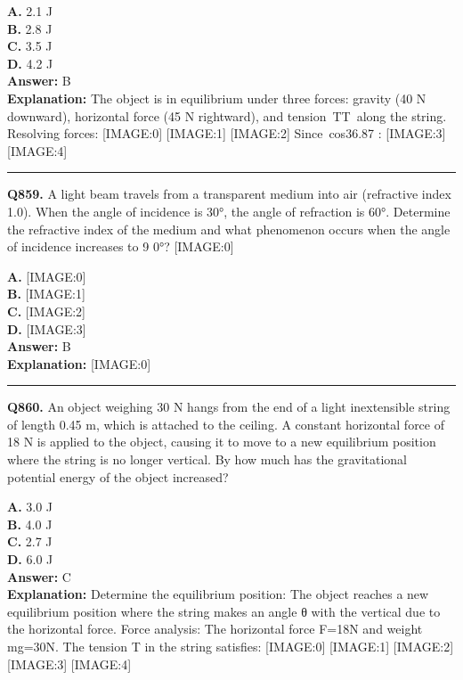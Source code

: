 \documentclass[12pt]{article}
\begin{document}
\textbf{A.} 2.1 J \\
\textbf{B.} 2.8 J \\
\textbf{C.} 3.5 J \\
\textbf{D.} 4.2 J \\

\textbf{Answer:} B \\
\textbf{Explanation:} The object is in equilibrium under three forces: gravity (40 N downward), horizontal force (45 N rightward), and tension TT along the string. Resolving forces:
[IMAGE:0]
[IMAGE:1]
[IMAGE:2]
Since cos36.87
:
[IMAGE:3]
[IMAGE:4]

\hrule
\vspace{1em}


\noindent
\textbf{Q859.} A light beam travels from a transparent medium into air (refractive index 1.0). When the angle of incidence is 30°, the angle of refraction is 60°. Determine the refractive index of the medium and what phenomenon occurs when the angle of incidence increases to
9
0°?
[IMAGE:0]



\textbf{A.} [IMAGE:0] \\
\textbf{B.} [IMAGE:1] \\
\textbf{C.} [IMAGE:2] \\
\textbf{D.} [IMAGE:3] \\

\textbf{Answer:} B \\
\textbf{Explanation:} [IMAGE:0]

\hrule
\vspace{1em}


\noindent
\textbf{Q860.} An object weighing 30 N hangs from the end of a light inextensible string of length 0.45 m, which is attached to the ceiling. A constant horizontal force of 18 N is applied to the object, causing it to move to a new equilibrium position where the string is no longer vertical. By how much has the gravitational potential energy of the object increased?



\textbf{A.} 3.0 J \\
\textbf{B.} 4.0 J \\
\textbf{C.} 2.7 J \\
\textbf{D.} 6.0 J \\

\textbf{Answer:} C \\
\textbf{Explanation:} Determine the equilibrium position: The object reaches a new equilibrium position where the string makes an angle θ with the vertical due to the horizontal force.
Force analysis: The horizontal force F=18N and weight mg=30N. The tension T in the string satisfies:
[IMAGE:0]
[IMAGE:1]
[IMAGE:2]
[IMAGE:3]
[IMAGE:4]
\end{document}
